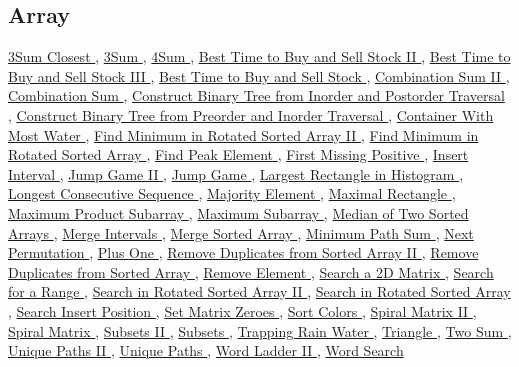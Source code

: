 \documentclass{article}
\begin{document}
\begin{CJK*}{UTF8}{gkai}
\subsection*{ Array }
\label{ Array }
\hyperref[ 3Sum Closest ]{ 3Sum Closest },
\hyperref[ 3Sum ]{ 3Sum },
\hyperref[ 4Sum ]{ 4Sum },
\hyperref[ Best Time to Buy and Sell Stock II ]{ Best Time to Buy and Sell Stock II },
\hyperref[ Best Time to Buy and Sell Stock III ]{ Best Time to Buy and Sell Stock III },
\hyperref[ Best Time to Buy and Sell Stock ]{ Best Time to Buy and Sell Stock },
\hyperref[ Combination Sum II ]{ Combination Sum II },
\hyperref[ Combination Sum ]{ Combination Sum },
\hyperref[ Construct Binary Tree from Inorder and Postorder Traversal ]{ Construct Binary Tree from Inorder and Postorder Traversal },
\hyperref[ Construct Binary Tree from Preorder and Inorder Traversal ]{ Construct Binary Tree from Preorder and Inorder Traversal },
\hyperref[ Container With Most Water ]{ Container With Most Water },
\hyperref[ Find Minimum in Rotated Sorted Array II ]{ Find Minimum in Rotated Sorted Array II },
\hyperref[ Find Minimum in Rotated Sorted Array ]{ Find Minimum in Rotated Sorted Array },
\hyperref[ Find Peak Element ]{ Find Peak Element },
\hyperref[ First Missing Positive ]{ First Missing Positive },
\hyperref[ Insert Interval ]{ Insert Interval },
\hyperref[ Jump Game II ]{ Jump Game II },
\hyperref[ Jump Game ]{ Jump Game },
\hyperref[ Largest Rectangle in Histogram ]{ Largest Rectangle in Histogram },
\hyperref[ Longest Consecutive Sequence ]{ Longest Consecutive Sequence },
\hyperref[ Majority Element ]{ Majority Element },
\hyperref[ Maximal Rectangle ]{ Maximal Rectangle },
\hyperref[ Maximum Product Subarray ]{ Maximum Product Subarray },
\hyperref[ Maximum Subarray ]{ Maximum Subarray },
\hyperref[ Median of Two Sorted Arrays ]{ Median of Two Sorted Arrays },
\hyperref[ Merge Intervals ]{ Merge Intervals },
\hyperref[ Merge Sorted Array ]{ Merge Sorted Array },
\hyperref[ Minimum Path Sum ]{ Minimum Path Sum },
\hyperref[ Next Permutation ]{ Next Permutation },
\hyperref[ Plus One ]{ Plus One },
\hyperref[ Remove Duplicates from Sorted Array II ]{ Remove Duplicates from Sorted Array II },
\hyperref[ Remove Duplicates from Sorted Array ]{ Remove Duplicates from Sorted Array },
\hyperref[ Remove Element ]{ Remove Element },
\hyperref[ Search a 2D Matrix ]{ Search a 2D Matrix },
\hyperref[ Search for a Range ]{ Search for a Range },
\hyperref[ Search in Rotated Sorted Array II ]{ Search in Rotated Sorted Array II },
\hyperref[ Search in Rotated Sorted Array ]{ Search in Rotated Sorted Array },
\hyperref[ Search Insert Position ]{ Search Insert Position },
\hyperref[ Set Matrix Zeroes ]{ Set Matrix Zeroes },
\hyperref[ Sort Colors ]{ Sort Colors },
\hyperref[ Spiral Matrix II ]{ Spiral Matrix II },
\hyperref[ Spiral Matrix ]{ Spiral Matrix },
\hyperref[ Subsets II ]{ Subsets II },
\hyperref[ Subsets ]{ Subsets },
\hyperref[ Trapping Rain Water ]{ Trapping Rain Water },
\hyperref[ Triangle ]{ Triangle },
\hyperref[ Two Sum ]{ Two Sum },
\hyperref[ Unique Paths II ]{ Unique Paths II },
\hyperref[ Unique Paths ]{ Unique Paths },
\hyperref[ Word Ladder II ]{ Word Ladder II },
\hyperref[ Word Search ]{ Word Search }


\end{CJK*}
\end{document}

